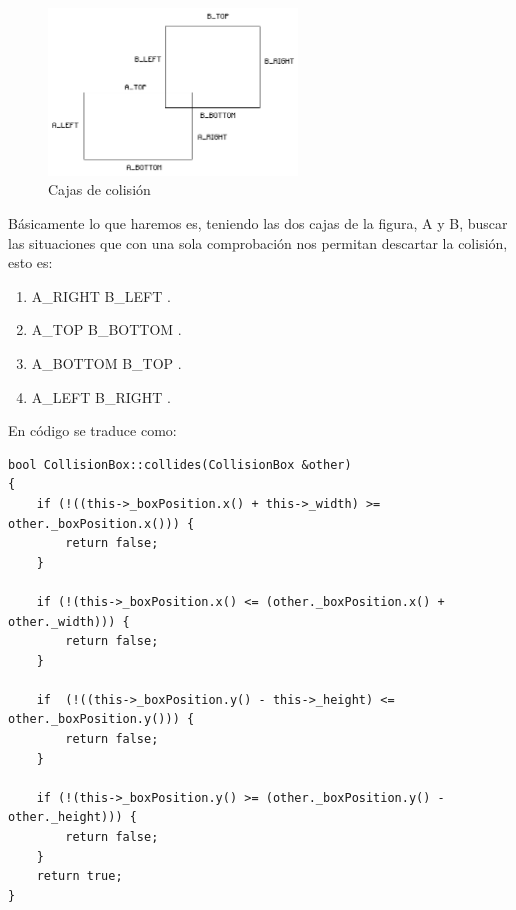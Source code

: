 \documentclass[parskip=half*]{scrartcl}
\begin{document}
	\begin{figure}[h]
		\centering
		\includegraphics[width=250]{boxes.png}
		\caption{Cajas de colisi\'on}
	\end{figure}

	B\'asicamente lo que haremos es, teniendo las dos cajas de la figura, A y B, buscar las situaciones que con una sola comprobaci\'on nos permitan descartar la colisi\'on, esto es:

	\begin{enumerate}
		\item A\_RIGHT \leq B\_LEFT .

		\item A\_TOP \leq B\_BOTTOM .

		\item A\_BOTTOM \geq B\_TOP .

		\item A\_LEFT \geq B\_RIGHT .
	\end{enumerate}

	En c\'odigo se traduce como:
	\begin{verbatim}
bool CollisionBox::collides(CollisionBox &other)
{    
    if (!((this->_boxPosition.x() + this->_width) >= other._boxPosition.x())) {
        return false;
    }
    
    if (!(this->_boxPosition.x() <= (other._boxPosition.x() + other._width))) {
        return false;
    }
    
    if  (!((this->_boxPosition.y() - this->_height) <= other._boxPosition.y())) {
        return false;
    }
    
    if (!(this->_boxPosition.y() >= (other._boxPosition.y() - other._height))) {
        return false;
    }
    return true;
}

	\end{verbatim}

\end{document}
